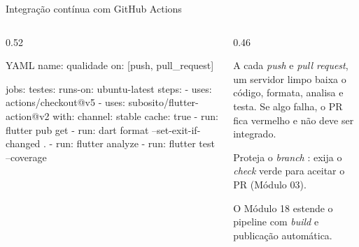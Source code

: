 \documentclass[aspectratio=169,10pt]{beamer}
\begin{document}
\begin{frame}[fragile]{Integração contínua com GitHub Actions}
  \begin{columns}[T]
    \begin{column}{0.52\textwidth}
\begin{codigo}[title=.github/workflows/qualidade.yml]{YAML}
name: qualidade
on: [push, pull_request]

jobs:
  testes:
    runs-on: ubuntu-latest
    steps:
      - uses: actions/checkout@v5
      - uses: subosito/flutter-action@v2
        with:
          channel: stable
          cache: true
      - run: flutter pub get
      - run: dart format --set-exit-if-changed .
      - run: flutter analyze
      - run: flutter test --coverage
\end{codigo}
    \end{column}
    \begin{column}{0.46\textwidth}
      \begin{conceito}
        A cada \emph{push} e \emph{pull request}, um servidor limpo baixa o código, formata, analisa e testa. Se algo falha, o PR fica vermelho e não deve ser integrado.
      \end{conceito}
      \begin{dica}
        Proteja o \emph{branch} : exija o \emph{check} verde para aceitar o PR (Módulo 03).
      \end{dica}
      \begin{dica}
        O Módulo 18 estende o pipeline com \emph{build} e publicação automática.
      \end{dica}
    \end{column}
  \end{columns}
\end{frame}
\end{document}
